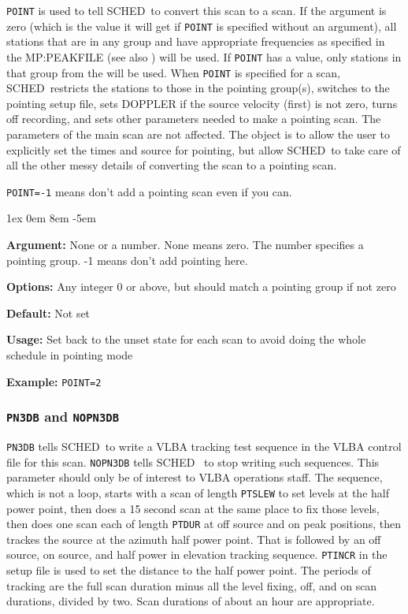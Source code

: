 \documentclass{report}
\newcommand{\schedb}{{\sc SCHED~}}
\newcommand{\rcwbox}[5]{
  \begin{list}{}{\parsep 1ex  \itemsep 0em
                 \leftmargin 8em  \itemindent -5em }
    \item {\bf Argument:} #1
    \item {\bf Options:}  #2
    \item {\bf Default:}  #3
    \item {\bf Usage:}    #4
    \item {\bf Example:}  #5
  \end{list}
}
\begin{document}
{\tt POINT} is used to tell \schedb to convert this scan to a
 scan.  If the argument
is zero (which is the value it will get if {\tt POINT} is specified
without an argument), all stations that are in any group and have
appropriate frequencies as specified in the 
{MP:PEAKFILE} (see also ) will
be used.  If {\tt POINT} has a value, only stations in that group
from the  will be used.  When
{\tt POINT} is specified for a scan, \schedb restricts the stations
to those in the pointing group(s), switches to the pointing setup
file, sets DOPPLER if the source velocity (first) is not zero, turns
off recording, and sets other parameters needed to make a pointing
scan.  The parameters of the main scan are not affected.  The object
is to allow the user to explicitly set the times and source for
pointing, but allow \schedb to take care of all the other messy
details of converting the scan to a pointing scan.

{\tt POINT=-1} means don't add a pointing scan even if you can.

\rcwbox
{None or a number.  None means zero.  The number specifies a pointing group.  -1 means don't add pointing here.}
{Any integer 0 or above, but should match a pointing group if not zero}
{Not set}
{Set back to the unset state for each scan to avoid doing the
whole schedule in pointing mode}
{{\tt POINT=2}}


\subsubsection{\label{MP:PN3DB}{\tt PN3DB} and {\tt NOPN3DB}}

{\tt PN3DB} tells \schedb to write a VLBA tracking test sequence in
the VLBA control file for this scan. {\tt NOPN3DB} tells \schedb
to stop writing such sequences.  This parameter should only be of
interest to VLBA operations staff.  The sequence, which is not a
loop, starts with a scan of length {\tt PTSLEW} to set levels at
the half power point, then does a 15 second scan at the same place
to fix those levels, then does one scan each of length {\tt PTDUR}
at off source and on peak positions, then trackes the source at
the azimuth half power point.  That is followed by an off source,
on source, and half power in elevation tracking sequence.  {\tt PTINCR}
in the setup file is used to set the distance to the half power point.
The periods of tracking are the full scan duration minus all the
level fixing, off, and on scan durations, divided by two.  Scan
durations of about an hour are appropriate.
\end{document}

